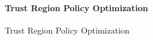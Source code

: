 \paragraph{Trust Region Policy Optimization} Trust Region Policy Optimization \cite{Schulman2015Trust, Wu2017Scalable}
